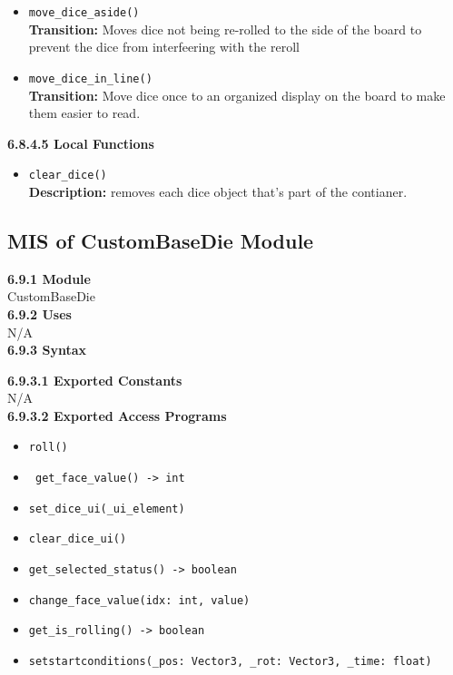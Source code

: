 \documentclass[12pt, titlepage]{article}
\begin{document}
\begin{itemize}
	\item \texttt{move\_dice\_aside() }\\
	\textbf{Transition:} Moves dice not being re-rolled to the side of the board to prevent the dice from interfeering with the reroll
	
	\item \texttt{move\_dice\_in\_line() }\\
	\textbf{Transition:} Move dice once to an organized display on the board to make them easier to read. 

	


\end{itemize}

\textbf{6.8.4.5 Local Functions}

\begin{itemize}
	
	\item \texttt{clear\_dice() }\\
	\textbf{Description:} removes each dice object that's part of the contianer. 
	
\end{itemize}


\subsection{MIS of CustomBaseDie Module}\label{CustomBaseDie}
\textbf{6.9.1 Module}\\
 CustomBaseDie\\

\noindent \textbf{6.9.2 Uses}\\
N/A \\

\noindent \textbf{6.9.3 Syntax}

\noindent \textbf{6.9.3.1 Exported Constants}\\
N/A\\

\textbf{6.9.3.2 Exported Access Programs}
\begin{itemize}
	\item \texttt{roll() }
	\item \texttt{ get\_face\_value() -> int }
	\item \texttt{set\_dice\_ui(\_ui\_element) }
	\item \texttt{clear\_dice\_ui() }
	\item \texttt{get\_selected\_status() -> boolean}
	\item \texttt{change\_face\_value(idx: int, value) }
	\item \texttt{get\_is\_rolling() -> boolean }
	\item \texttt{setstartconditions(\_pos: Vector3, \_rot: Vector3, \_time: float) }
	
	
\end{itemize}
\end{document}
